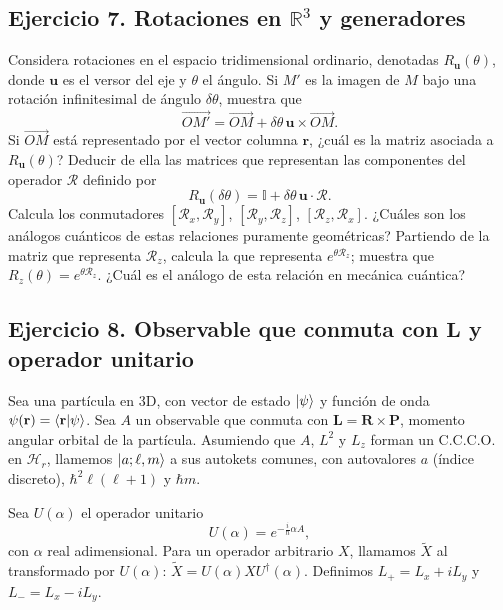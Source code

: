 \documentclass[a4paper,11pt]{article}
\begin{document}
\subsection*{Ejercicio 7. Rotaciones en $\mathbb{R}^3$ y generadores}
Considera rotaciones en el espacio tridimensional ordinario, denotadas $R_{\mathbf{u}}(\theta)$, donde $\mathbf{u}$ es el versor del eje y $\theta$ el ángulo. Si $M'$ es la imagen de $M$ bajo una rotación infinitesimal de ángulo $\delta\theta$, muestra que
\[
\overrightarrow{OM'}=\overrightarrow{OM}+\delta\theta\,\mathbf{u}\times\overrightarrow{OM}.
\]
Si $\overrightarrow{OM}$ está representado por el vector columna $\mathbf{r}$, ¿cuál es la matriz asociada a $R_{\mathbf{u}}(\theta)$? Deducir de ella las matrices que representan las componentes del operador $\mathcal{R}$ definido por
\[
R_{\mathbf{u}}(\delta\theta)=\mathbb{I}+\delta\theta\,\mathbf{u}\cdot\mathcal{R}.
\]
Calcula los conmutadores $[\mathcal{R}_x,\mathcal{R}_y]$, $[\mathcal{R}_y,\mathcal{R}_z]$, $[\mathcal{R}_z,\mathcal{R}_x]$. ¿Cuáles son los análogos cuánticos de estas relaciones puramente geométricas? Partiendo de la matriz que representa $\mathcal{R}_z$, calcula la que representa $e^{\theta\mathcal{R}_z}$; muestra que $R_z(\theta)=e^{\theta\mathcal{R}_z}$. ¿Cuál es el análogo de esta relación en mecánica cuántica?

\subsection*{Ejercicio 8. Observable que conmuta con $\mathbf{L}$ y operador unitario}
Sea una partícula en 3D, con vector de estado $\ket{\psi}$ y función de onda $\psi(\mathbf{r})=\braket{\mathbf{r}|\psi}$. Sea $A$ un observable que conmuta con $\mathbf{L}=\mathbf{R}\times\mathbf{P}$, momento angular orbital de la partícula. Asumiendo que $A$, $L^2$ y $L_z$ forman un C.C.C.O. en $\mathcal{H}_r$, llamemos $\ket{a;\ell,m}$ a sus autokets comunes, con autovalores $a$ (índice discreto), $\hbar^2\ell(\ell+1)$ y $\hbar m$.

Sea $U(\alpha)$ el operador unitario
\[
U(\alpha)=e^{-\tfrac{i}{\hbar}\alpha A},
\]
con $\alpha$ real adimensional. Para un operador arbitrario $X$, llamamos $\tilde X$ al transformado por $U(\alpha)$: $\tilde X=U(\alpha) X U^{\dagger}(\alpha)$. Definimos $L_+=L_x+iL_y$ y $L_-=L_x-iL_y$.
\end{document}
